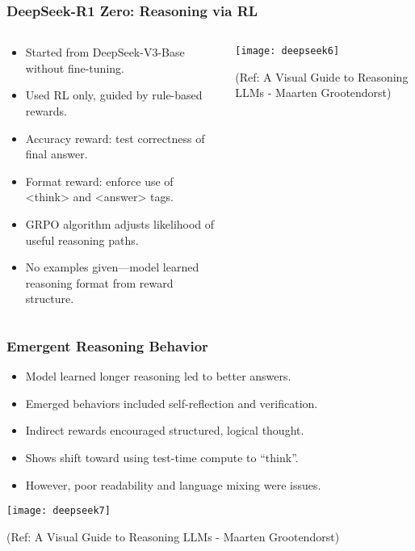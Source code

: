 \begin{frame}[fragile]\frametitle{DeepSeek-R1 Zero: Reasoning via RL}
\begin{columns}
    \begin{column}[T]{0.5\linewidth}
      \begin{itemize}
        \item Started from DeepSeek-V3-Base without fine-tuning.
        \item Used RL only, guided by rule-based rewards.
        \item Accuracy reward: test correctness of final answer.
        \item Format reward: enforce use of <think> and <answer> tags.
        \item GRPO algorithm adjusts likelihood of useful reasoning paths.
        \item No examples given—model learned reasoning format from reward structure.
      \end{itemize}
    \end{column}
    \begin{column}[T]{0.5\linewidth}
        \begin{center}
        \texttt{[image: deepseek6]}
		
		{\tiny (Ref: A Visual Guide to Reasoning LLMs - Maarten Grootendorst)}
        \end{center}    
    \end{column}
  \end{columns}
\end{frame}

\begin{frame}[fragile]\frametitle{Emergent Reasoning Behavior}

      \begin{itemize}
        \item Model learned longer reasoning led to better answers.
        \item Emerged behaviors included self-reflection and verification.
        \item Indirect rewards encouraged structured, logical thought.
        \item Shows shift toward using test-time compute to “think”.
        \item However, poor readability and language mixing were issues.
      \end{itemize}

        \begin{center}
        \texttt{[image: deepseek7]}
		
		{\tiny (Ref: A Visual Guide to Reasoning LLMs - Maarten Grootendorst)}
		
        \end{center}    

\end{frame}


